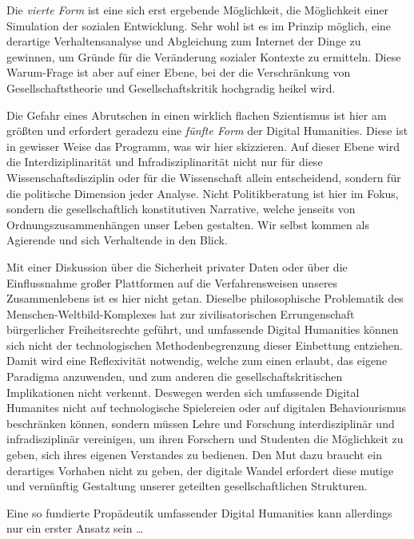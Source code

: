 \documentclass[12pt,a4paper]{article}
\begin{document}
Die \emph{vierte Form} ist eine sich erst ergebende Möglichkeit, die
Möglichkeit einer Simulation der sozialen Entwicklung. Sehr wohl ist es im
Prinzip möglich, eine derartige Verhaltensanalyse und Abgleichung zum Internet
der Dinge zu gewinnen, um Gründe für die Veränderung sozialer Kontexte zu
ermitteln. Diese Warum-Frage ist aber auf einer Ebene, bei der die
Verschränkung von Gesellschaftstheorie und Gesellschaftskritik hochgradig
heikel wird.

Die Gefahr eines Abrutschen in einen wirklich flachen Szientismus ist hier am
größten und erfordert geradezu eine \emph{fünfte Form} der Digital Humanities.
Diese ist in gewisser Weise das Programm, was wir hier skizzieren. Auf dieser
Ebene wird die Interdiziplinarität und Infradisziplinarität nicht nur für
diese Wissenschaftsdisziplin oder für die Wissenschaft allein entscheidend,
sondern für die politische Dimension jeder Analyse. Nicht Politikberatung ist
hier im Fokus, sondern die gesellschaftlich konstitutiven Narrative, welche
jenseits von Ordnungszusammenhängen unser Leben gestalten. Wir selbst kommen
als Agierende und sich Verhaltende in den Blick.

Mit einer Diskussion über die Sicherheit privater Daten oder über die
Einflussnahme großer Plattformen auf die Verfahrensweisen unseres
Zusammenlebens ist es hier nicht getan. Dieselbe philosophische Problematik
des Menschen-Weltbild-Komplexes hat zur zivilisatorischen Errungenschaft
bürgerlicher Freiheitsrechte geführt, und umfassende Digital Humanities können
sich nicht der technologischen Methodenbegrenzung dieser Einbettung
entziehen. Damit wird eine Reflexivität notwendig, welche zum einen erlaubt,
das eigene Paradigma anzuwenden, und zum anderen die gesellschaftskritischen
Implikationen nicht verkennt. Deswegen werden sich umfassende Digital
Humanites nicht auf technologische Spielereien oder auf digitalen
Behaviourismus beschränken können, sondern müssen Lehre und Forschung
interdisziplinär und infradisziplinär vereinigen, um ihren Forschern und
Studenten die Möglichkeit zu geben, sich ihres eigenen Verstandes zu
bedienen. Den Mut dazu braucht ein derartiges Vorhaben nicht zu geben, der
digitale Wandel erfordert diese mutige und vernünftig Gestaltung unserer
geteilten gesellschaftlichen Strukturen.

Eine so fundierte Propädeutik umfassender Digital Humanities kann allerdings
nur ein erster Ansatz sein \ldots

\ccnotiz
\end{document}
